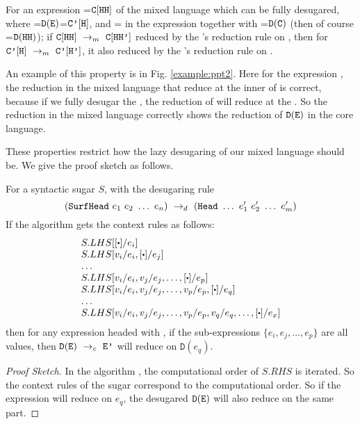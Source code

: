 \begin{property} \label{thm2}
	For an expression =$\mbox{\tt C}[\mbox{\tt HH}]$ of the mixed language which can be fully desugared, where =$\mathtt{D}(\mbox{\tt E})$=$\mbox{\tt C'}[\mbox{\tt H}]$, and = in the expression  together with =$\mathtt{D}(\mbox{\tt C})$ (then of course =$\mathtt{D}(\mbox{\tt HH})$); if $\mbox{\tt C}[\mbox{\tt HH}] ~\rightarrow_m~\mbox{\tt C}[\mbox{\tt HH'}]$ reduced by the 's reduction rule on , then for $\mbox{\tt C'}[\mbox{\tt H}] ~\rightarrow_m~\mbox{\tt C'}[\mbox{\tt H'}]$, it also reduced by the 's reduction rule on .
\end{property}

An example of this property is in Fig. \ref{example:ppt2}. Here for the expression ,
the reduction in the mixed language that reduce at the inner  of 
is correct, because if we fully desugar the , the reduction of  will reduce at the .
So the reduction in the mixed language correctly shows the reduction of $\mathtt{D}(\mbox{\tt E})$ in the core language.

These properties restrict how the lazy desugaring of our mixed language should be. We give the proof sketch as follows.

\begin{lemma}
	For a syntactic sugar $S$, with the desugaring rule
	\[
	(\mbox{\tt SurfHead}~e_1~e_2~\ldots~e_n) ~\rightarrow_d~ (\mbox{\tt Head}~\ldots~e_1'~e_2'~\ldots~e_m')
	\]
	If the algorithm  gets the context rules as follows:
	\[
		\begin{array}{l}
			S.LHS[[\bigcdot]/e_i]\\
			S.LHS[v_i/e_i, [\bigcdot]/e_j]\\
			\ldots\\
			S.LHS[v_i/e_i, v_j/e_j, \ldots, [\bigcdot]/e_p]\\
			S.LHS[v_i/e_i, v_j/e_j, \ldots, v_p/e_p, [\bigcdot]/e_q]\\
			\ldots\\
			S.LHS[v_i/e_i, v_j/e_j, \ldots, v_p/e_p, v_q/e_q, \ldots, [\bigcdot]/e_x]\\
		\end{array}
	\]
then for any expression  headed with , if the sub-expressions $\{e_i, e_j, \ldots, e_p\}$ are all values, then $\mathtt{D}(\mbox{\tt E}) ~\rightarrow_c~\mbox{\tt E'}$ will reduce on $\mathtt{D}(e_q)$.
\end{lemma}
\begin{proof}[Proof Sketch]
In the algorithm , the computational order of $S.RHS$ is iterated. So the context rules of the sugar correspond to the computational order.
So if the expression  will reduce on $e_q$, the desugared $\mathtt{D}(\mbox{\tt E})$ will also reduce on the same part.
\end{proof}

